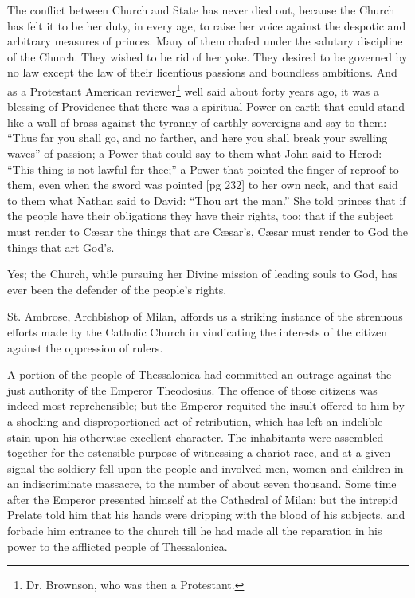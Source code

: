 The conflict between Church and State has
never died out, because the Church has felt it to
be her duty, in every age, to raise her voice
against the despotic and arbitrary measures of
princes. Many of them chafed under the salutary
discipline of the Church. They wished to be rid of
her yoke. They desired to be governed by no law
except the law of their licentious passions and
boundless ambitions. And as a Protestant American
reviewer\footnote{Dr. Brownson, who was
then a Protestant.} well said about forty years ago, it was
a blessing of Providence that there was a spiritual
Power on earth that could stand like a wall of brass
against the tyranny of earthly sovereigns and say
to them: “Thus far you shall go, and no farther,
and here you shall break your swelling waves” of
passion; a Power that could say to them what
John said to Herod: “This thing is not lawful
for thee;” a Power that pointed the finger of
reproof to them, even when the sword was pointed
[pg 232]
to her own neck, and that said to them what
Nathan said to David: “Thou art the man.” She
told princes that if the people have their obligations
they have their rights, too; that if the subject
must render to Cæsar the things that are
Cæsar's, Cæsar must render to God the things that
art God's.

Yes; the Church, while pursuing her Divine mission
of leading souls to God, has ever been the
defender of the people's rights.

St. Ambrose, Archbishop of Milan, affords us a
striking instance of the strenuous efforts made by
the Catholic Church in vindicating the interests
of the citizen against the oppression of rulers.

A portion of the people of Thessalonica had
committed an outrage against the just authority
of the Emperor Theodosius. The offence of those
citizens was indeed most reprehensible; but the
Emperor requited the insult offered to him by a
shocking and disproportioned act of retribution,
which has left an indelible stain upon his otherwise
excellent character. The inhabitants were
assembled together for the ostensible purpose of
witnessing a chariot race, and at a given signal
the soldiery fell upon the people and involved
men, women and children in an indiscriminate
massacre, to the number of about seven thousand.
Some time after the Emperor presented himself
at the Cathedral of Milan; but the intrepid Prelate
told him that his hands were dripping with the
blood of his subjects, and forbade him entrance
to the church till he had made all the reparation
in his power to the afflicted people of Thessalonica.

